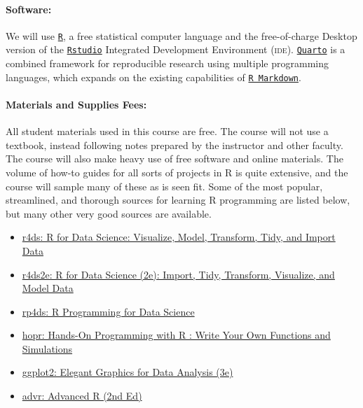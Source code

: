 \documentclass[11pt]{article}
\begin{document}
\paragraph{Software:}
We will use \href{https://cloud.r-project.org}{\texttt{R}}, a free statistical computer language and the free-of-charge Desktop version of the \href{https://posit.co/download/rstudio-desktop}{\texttt{Rstudio}} Integrated Development Environment (\textsc{ide}). \href{https://quarto.org}{\texttt{Quarto}} is a combined framework for reproducible research using multiple programming languages, which expands on the existing capabilities of \href{https://rmarkdown.rstudio.com/}{\texttt{R Markdown}}.

\paragraph{Materials and Supplies Fees:} 
All student materials used in this course are free. The course will not use a textbook, instead following notes prepared by the instructor and other faculty. The course will also make heavy use of free software and online materials. The volume of how-to guides for all sorts of projects in R is quite extensive, and the course will sample many of these as is seen fit. Some of the most popular, streamlined, and thorough sources for learning R programming are listed below, but many other very good sources are available.
	
\begin{itemize}
	\item \href{https://r4ds.had.co.nz}{r4ds: R for Data Science: Visualize, Model, Transform, Tidy, and Import Data}
	\item \href{https://r4ds.hadley.nz}{r4ds2e: R for Data Science (2e): Import, Tidy, Transform, Visualize, and Model Data}
	\item \href{https://bookdown.org/rdpeng/rprogdatascience}{rp4ds: R Programming for Data Science}
	\item \href{https://rstudio-education.github.io/hopr}{hopr: Hands-On Programming with R : Write Your Own Functions and Simulations}
	\item \href{https://ggplot2-book.org}{ggplot2: Elegant Graphics for Data Analysis (3e)}
	\item \href{https://adv-r.hadley.nz}{advr: Advanced R (2nd Ed)}
\end{itemize}
	
\end{document}
